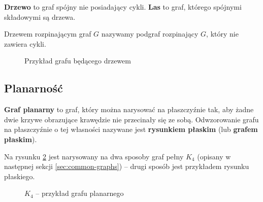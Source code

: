 \textbf{Drzewo} to graf spójny nie posiadający cykli. \textbf{Las} to graf, którego spójnymi składowymi są drzewa.

Drzewem rozpinającym graf $G$ nazywamy podgraf rozpinający $G$, który nie zawiera cykli\cite[10]{wilson-beineke}. 

\begin{figure}[h]
\centering
{}
\caption{Przykład grafu będącego drzewem} \label{fig:tree-example}
\end{figure}

\subsection*{Planarność}

\textbf{Graf planarny} to graf, który można narysować na płaszczyźnie tak, aby żadne dwie krzywe obrazujące krawędzie nie przecinały się ze sobą. Odwzorowanie grafu na płaszczyźnie o tej własności nazywane jest \textbf{rysunkiem płaskim} (lub \textbf{grafem płaskim})\cite[82]{wilson}. 

Na rysunku \ref{fig:planar-graph-example} jest narysowany na dwa sposoby graf pełny $K_4$ (opisany w następnej sekcji \ref{sec:common-graphs}) -- drugi sposób jest przykładem rysunku płaskiego. 

\begin{figure}[h]
\centering
{}
\caption{$K_4$ -- przykład grafu planarnego} \label{fig:planar-graph-example}
\end{figure}